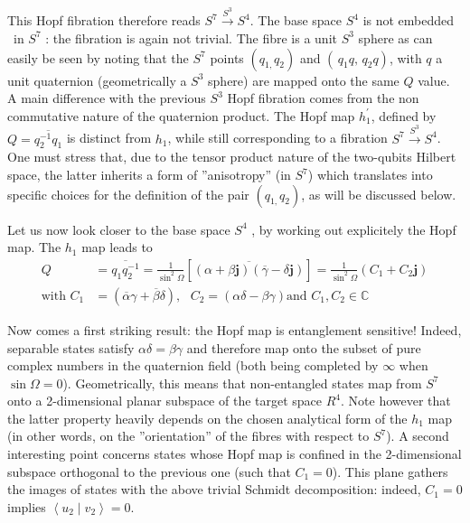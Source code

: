 \documentclass{amsart}
\begin{document}
This Hopf fibration therefore reads $S^{7}\overset{S^{3}}{\rightarrow}S^{4}$.
The base space $S^{4}$ is not embedded \ in $S^{7}$ : the fibration is again
not trivial. The fibre is a unit $S^{3}$ sphere as can easily be seen by
noting that the $S^{7}$ points $\left(  q_{1,}q_{2}\right)  $ and $\left(
\,q_{1}q,\,q_{2}q\right)  $, with $q$ a unit quaternion (geometrically a
$S^{3}$ sphere) are mapped onto the same $Q$ value. A main difference with the
previous $S^{3}$ Hopf fibration comes from the non commutative nature of the
quaternion product. The Hopf map $h_{1}^{\prime}$, defined by $Q=\overline
{q_{2}^{-1}q_{1}}$ is distinct from $h_{1}$, while still corresponding to a
fibration $S^{7}\overset{S^{3}}{\rightarrow}S^{4}$. One must stress that, due
to the tensor product nature of the two-qubits Hilbert space, the latter
inherits a form of ''anisotropy'' (in $S^{7}$) which translates into specific
choices for the definition of the pair $\left(  q_{1,}q_{2}\right)  $, as will
be discussed below.

Let us now look closer to the base space $S^{4}$ , by working out explicitely
the Hopf map. The $h_{1}$ map leads to%
\begin{align}
Q  &  =\overline{q_{1}q_{2}^{-1}}=\frac{1}{\sin^{2}\Omega}\left[
\overline{\left(  \alpha+\beta\mathbf{j}\right)  \left(  \overline{\gamma
}-\delta\mathbf{j}\right)  }\right]  =\frac{1}{\sin^{2}\Omega}\left(
C_{1}+C_{2}\mathbf{j}\right) \\
\text{with }C_{1}  &  =\left(  \overline{\alpha}\gamma+\overline{\beta}%
\delta\right)  ,\text{ }C_{2}=\left(  \alpha\delta-\beta\gamma\right)  \text{
and }C_{1},C_{2}\in\mathbb{C}\nonumber
\end{align}

Now comes a first striking result: the Hopf map is entanglement sensitive!
Indeed, separable states satisfy $\alpha\delta=\beta\gamma$ and therefore map
onto the subset of pure complex numbers in the quaternion field (both being
completed by $\infty$ when $\sin\Omega=0$). Geometrically, this means that
non-entangled states map from $S^{7}$ onto a 2-dimensional planar subspace of
the target space $R^{4}$. Note however that the latter property heavily
depends on the chosen analytical form of the $h_{1}$ map (in other words, on
the ''orientation'' of the fibres with respect to $S^{7}$). A second
interesting point concerns states whose Hopf map is confined in the
2-dimensional subspace orthogonal to the previous one (such that $C_{1}=0$).
This plane gathers the images of states with the above trivial Schmidt
decomposition: indeed, $C_{1}=0$ implies $\left\langle u_{2}\mid
v_{2}\right\rangle =0.$
\end{document}
